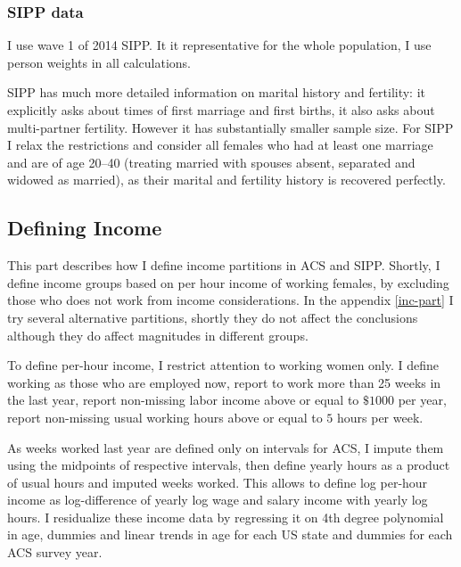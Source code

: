 \documentclass[12pt,letter]{article}
\begin{document}
\subsubsection{SIPP data}

I use wave 1 of 2014 SIPP. It it representative for the whole population, I use person weights in all calculations.

SIPP has much more detailed information on marital history and fertility: it explicitly asks about times of first marriage and first births, it also asks about multi-partner fertility. However it has substantially smaller sample size. For SIPP I relax the restrictions and consider all females who had at least one marriage and are of age 20--40 (treating married with spouses absent, separated and widowed as married), as their marital and fertility history is recovered perfectly.


\subsection{Defining Income}
This part describes how I define income partitions in ACS and SIPP. Shortly, I define income groups based on per hour income of working females, by excluding those who does not work from income considerations. In the appendix \ref{inc-part} I try several alternative partitions, shortly they do not affect the conclusions although they do affect magnitudes in different groups. 

To define per-hour income, I restrict attention to working women only. I define working as those who are employed now, report to work more than 25 weeks in the last year, report non-missing labor income above or equal to $\$1000$ per year, report non-missing usual working hours above or equal to $5$ hours per week.

As weeks worked last year are defined only on intervals for ACS, I impute them using the midpoints of respective intervals, then define yearly hours as a product of usual hours and imputed weeks worked. This allows to define log per-hour income as log-difference of yearly log wage and salary income with yearly log hours. I residualize these income data by regressing it on 4th degree polynomial in age, dummies and linear trends in age for each US state and dummies for each ACS survey year.
\end{document}
